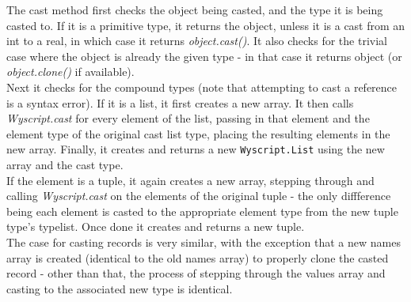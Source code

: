 The cast method first checks the object being casted, and the type it is being casted to. If it is a primitive type, it returns the object, unless it is a cast from an int to a real, in which case it returns {\em object.cast()}. It also checks for the trivial case where the object is already the given type - in that case it returns object (or {\em object.clone()} if available).\\

Next it checks for the compound types (note that attempting to cast a reference is a syntax error). If it is a list, it first creates a new array. It then calls {\em Wyscript.cast} for every element of the list, passing in that element and the element type of the original cast list type, placing the resulting elements in the new array. Finally, it creates and returns a new \lstinline{Wyscript.List} using the new array and the cast type.\\

If the element is a tuple, it again creates a new array, stepping through and calling {\em Wyscript.cast} on the elements of the original tuple - the only diffference being each element is casted to the appropriate element type from the new tuple type's typelist. Once done it creates and returns a new tuple.\\

The case for casting records is very similar, with the exception that a new names array is created (identical to the old names array) to properly clone the casted record - other than that, the process of stepping through the values array and casting to the associated new type is identical.
